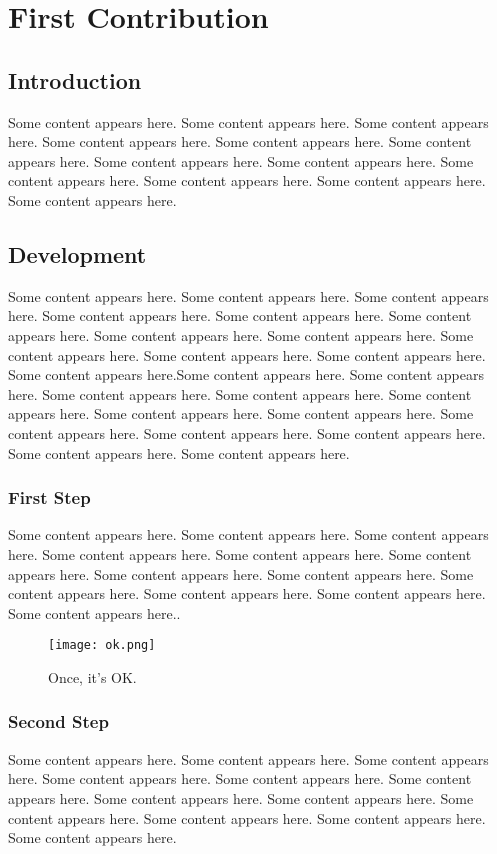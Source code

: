 \chapter{First Contribution}
\label{sec:contribution1}

\section{Introduction}
Some content appears here. Some content appears here. Some content appears here. Some content appears here. Some content appears here. Some content appears here.
Some content appears here. Some content appears here. Some content appears here.
Some content appears here. Some content appears here. Some content appears here.


\section{Development}
Some content appears here. Some content appears here. Some content appears here. Some content appears here. Some content appears here. Some content appears here.
Some content appears here. Some content appears here. Some content appears here.
Some content appears here. Some content appears here. Some content appears here.Some content appears here. Some content appears here. Some content appears here. Some content appears here. Some content appears here. Some content appears here.
Some content appears here. Some content appears here. Some content appears here.
Some content appears here. Some content appears here. Some content appears here.



\subsection{First Step}
Some content appears here. Some content appears here. Some content appears here. Some content appears here. Some content appears here. Some content appears here.
Some content appears here. Some content appears here. Some content appears here.
Some content appears here. Some content appears here. Some content appears here..

\begin{figure}[hbt!]
  \centering
  \texttt{[image: ok.png]}
  \caption{Once, it's OK.}
  \label{fig:ok0}
\end{figure}



\subsection{Second Step}
Some content appears here. Some content appears here. Some content appears here. Some content appears here. Some content appears here. Some content appears here.
Some content appears here. Some content appears here. Some content appears here.
Some content appears here. Some content appears here. Some content appears here.



